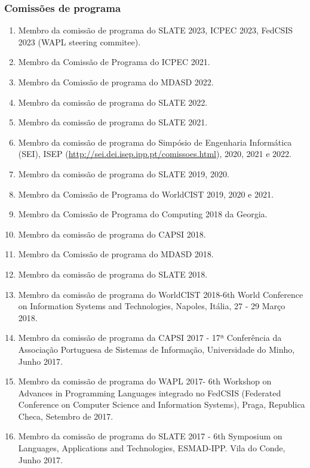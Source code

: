 \documentclass[11pt]{article}
\begin{document}
\subsubsection{Comissões de programa}
\begin{enumerate}
\item {Membro da comissão de programa do SLATE 2023, ICPEC 2023, FedCSIS 2023 (WAPL steering commitee).}
\item {Membro da Comissão de Programa do ICPEC 2021.}
\item {Membro da Comissão de programa do MDASD 2022.}
\item {Membro da comissão de programa do SLATE 2022.}
\item {Membro da comissão de programa do SLATE 2021.}
\item {Membro da comissão de programa do Simpósio de Engenharia Informática (SEI), ISEP (\url{http://sei.dei.isep.ipp.pt/comissoes.html}), 2020, 2021 e 2022.}
\item {Membro da comissão de programa do SLATE 2019, 2020.}
\item {Membro da Comissão de Programa do WorldCIST 2019, 2020 e 2021.}
\item {Membro da Comissão de Programa do Computing 2018 da Georgia.}
\item {Membro da comissão de programa do CAPSI 2018.}
\item {Membro da Comissão de programa do MDASD 2018.}
\item {Membro da comissão de programa do SLATE 2018.}

\item {Membro da comissão de programa do WorldCIST 2018-6th World Conference on Information Systems and Technologies, Napoles, Itália, 27 - 29 Março 2018.}

\item {Membro da comissão de programa da CAPSI 2017 - 17ª Conferência da Associação Portuguesa de Sistemas de Informação, Universidade do Minho, Junho 2017. }

\item {Membro da comissão de programa do WAPL 2017- 6th Workshop on Advances in Programming Languages integrado no FedCSIS (Federated Conference on Computer Science and Information Systems), Praga, Republica Checa, Setembro de 2017.}

\item {Membro da comissão de programa do SLATE 2017 - 6th Symposium on Languages, Applications and Technologies, ESMAD-IPP. Vila do Conde, Junho 2017.}


\end{enumerate}
\end{document}

